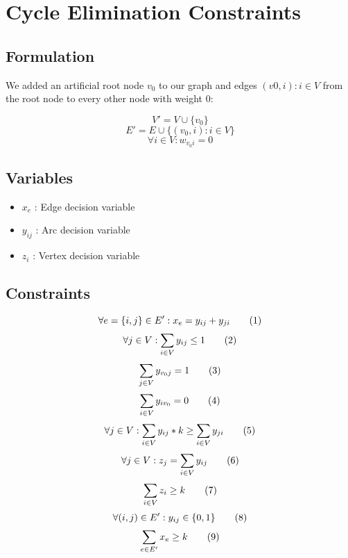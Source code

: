 \section{Cycle Elimination Constraints}

\subsection{Formulation}

We added an artificial root node $v_0$ to our graph and edges $(v0,i) : i \in V$  from the root node to every other node with weight $0$:

\[V' = V \cup \{v_0\}\]
\[E' = E \cup \{(v_0,i) : i \in V\}\]
\[\forall i \in V : w_{v_0i} = 0 \]

\subsection{Variables}

\begin{itemize}
	\item $x_{e}$ : Edge decision variable
	\item $y_{ij}$ : Arc decision variable
	\item $z_{i}$ : Vertex decision variable
\end{itemize}

\subsection{Constraints}
\[\forall e = \{i,j\} \in E' : x_e = y_{ij} + y_{ji} \addtag \]
\[\forall j \in V : \sum_{i \in V}y_{ij} \leq 1 \addtag \]
\[\sum_{j \in V}y_{v_0j} = 1 \addtag \]
\[\sum_{i \in V}y_{iv_0} = 0 \addtag \]
\[\forall j \in V : \sum_{i \in V}y_{ij} * k \geq \sum_{i \in V}y_{ji} \addtag \]
\[\forall j \in V : z_j = \sum_{i \in V}y_{ij} \addtag \]
\[\sum_{i \in V}z_i \geq k \addtag \]
\[\forall (i,j) \in E' : y_{ij} \in \{0,1\} \addtag \]
\[\sum_{e \in E'}x_e \geq k \addtag \]


